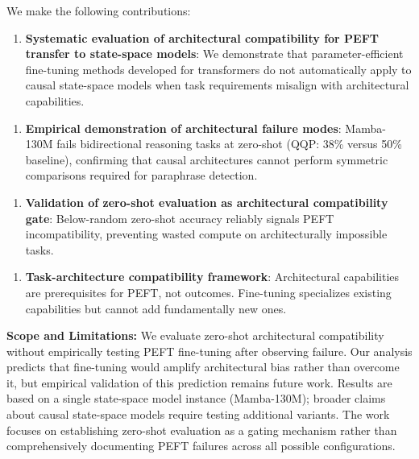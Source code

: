 We make the following contributions:

\begin{enumerate}
\item \textbf{Systematic evaluation of architectural compatibility for PEFT transfer to state-space models}: We demonstrate that parameter-efficient fine-tuning methods developed for transformers do not automatically apply to causal state-space models when task requirements misalign with architectural capabilities.
\end{enumerate}

\begin{enumerate}
\item \textbf{Empirical demonstration of architectural failure modes}: Mamba-130M fails bidirectional reasoning tasks at zero-shot (QQP: 38\% versus 50\% baseline), confirming that causal architectures cannot perform symmetric comparisons required for paraphrase detection.
\end{enumerate}

\begin{enumerate}
\item \textbf{Validation of zero-shot evaluation as architectural compatibility gate}: Below-random zero-shot accuracy reliably signals PEFT incompatibility, preventing wasted compute on architecturally impossible tasks.
\end{enumerate}

\begin{enumerate}
\item \textbf{Task-architecture compatibility framework}: Architectural capabilities are prerequisites for PEFT, not outcomes. Fine-tuning specializes existing capabilities but cannot add fundamentally new ones.
\end{enumerate}

\textbf{Scope and Limitations:} We evaluate zero-shot architectural compatibility without empirically testing PEFT fine-tuning after observing failure. Our analysis predicts that fine-tuning would amplify architectural bias rather than overcome it, but empirical validation of this prediction remains future work. Results are based on a single state-space model instance (Mamba-130M); broader claims about causal state-space models require testing additional variants. The work focuses on establishing zero-shot evaluation as a gating mechanism rather than comprehensively documenting PEFT failures across all possible configurations.
